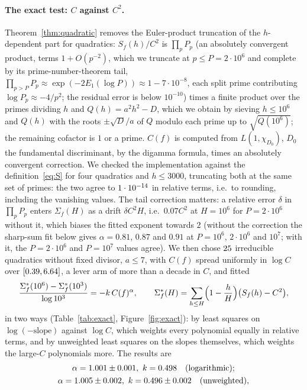 \documentclass[11pt,a4paper]{article}
\theoremstyle{remark}\newtheorem{remark}[theorem]{Remark}
\begin{document}
\paragraph{The exact test: $C$ against $C^2$.} Theorem~\ref{thm:quadratic} removes the Euler-product
truncation of the $h$-dependent part for quadratics: $S_f(h)/C^2$ is $\prod_pP_p$ (an absolutely
convergent product, terms $1+O(p^{-2})$, which we truncate at $p\le P=2\cdot10^6$ and complete by its
prime-number-theorem tail, $\prod_{p>P}P_p\approx\exp(-2E_1(\log P))\approx1-7\cdot10^{-8}$, each split prime
contributing $\log P_p\approx-4/p^2$; the residual error is below $10^{-10}$) times a finite product over
the primes dividing $h$ and $Q(h)=a^2h^2-D$, which we
obtain by sieving $h\le10^6$ and $Q(h)$ with the roots $\pm\sqrt D/a$ of $Q$ modulo each prime up to
$\sqrt{Q(10^6)}$; the remaining cofactor is $1$ or a prime. $C(f)$ is computed from $L(1,\chi_{D_0})$,
$D_0$ the fundamental discriminant, by the digamma formula, times an absolutely convergent correction.
We checked the implementation against the definition~\eqref{eq:S} for four quadratics and $h\le3000$,
truncating both at the same set of primes: the two agree to $1\cdot10^{-14}$ in relative terms, i.e.\ to
rounding, including the vanishing values. The tail correction matters: a relative error $\delta$ in
$\prod_pP_p$ enters $\Sigma_f(H)$ as a drift $\delta C^2H$, i.e.\ $0.07C^2$ at $H=10^6$ for $P=2\cdot10^6$
without it, which biases the fitted exponent towards $2$ (without the correction the sharp-sum fit below
gives $\alpha=0.81$, $0.87$ and $0.91$ at $P=10^6$, $2\cdot10^6$ and $10^7$; with it, the $P=2\cdot10^6$ and $P=10^7$
values agree). We then chose $25$ irreducible quadratics without fixed divisor, $a\le7$, with $C(f)$ spread
uniformly in $\log C$ over $[0.39,6.64]$, a lever arm of more than a decade in $C$, and fitted
\[
\frac{\Sigma^\ast_f(10^6)-\Sigma^\ast_f(10^3)}{\log10^3}=-k\,C(f)^\alpha,\qquad
\Sigma^\ast_f(H)=\sum_{h\le H}\Bigl(1-\frac hH\Bigr)\bigl(S_f(h)-C^2\bigr),
\]
in two ways (Table~\ref{tab:exact}, Figure~\ref{fig:exact}): by least squares on
$\log(-\text{slope})$ against $\log C$, which weights every polynomial equally in relative terms, and by
unweighted least squares on the slopes themselves, which weights the large-$C$ polynomials more. The
results are
\[
\begin{gathered}
\alpha=\exCesAlpha\pm\exCesAlphaSe,\ k=\exCesK\quad\text{(logarithmic)};\\
\alpha=\exCesAlphaLin\pm\exCesAlphaLinSe,\ k=\exCesKLin\pm\exCesKLinSe\quad\text{(unweighted)},
\end{gathered}
\]
\end{document}
